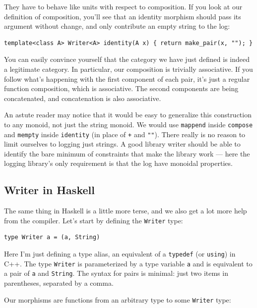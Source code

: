 They have to behave like units with respect to composition. If you look
at our definition of composition, you'll see that an identity morphism
should pass its argument without change, and only contribute an empty
string to the log:

\begin{verbatim}
template<class A> Writer<A> identity(A x) { return make_pair(x, ""); }
\end{verbatim}

You can easily convince yourself that the category we have just defined
is indeed a legitimate category. In particular, our composition is
trivially associative. If you follow what's happening with the first
component of each pair, it's just a regular function composition, which
is associative. The second components are being concatenated, and
concatenation is also associative.

An astute reader may notice that it would be easy to generalize this
construction to any monoid, not just the string monoid. We would use
\texttt{mappend} inside \texttt{compose} and \texttt{mempty} inside
\texttt{identity} (in place of \texttt{+} and \texttt{""}). There really
is no reason to limit ourselves to logging just strings. A good library
writer should be able to identify the bare minimum of constraints that
make the library work --- here the logging library's only requirement is
that the log have monoidal properties.

\subsection{Writer in Haskell}\label{writer-in-haskell}

The same thing in Haskell is a little more terse, and we also get a lot
more help from the compiler. Let's start by defining the \texttt{Writer}
type:

\begin{verbatim}
type Writer a = (a, String)
\end{verbatim}

Here I'm just defining a type alias, an equivalent of a \texttt{typedef}
(or \texttt{using}) in C++. The type \texttt{Writer} is parameterized by
a type variable \texttt{a} and is equivalent to a pair of \texttt{a} and
\texttt{String}. The syntax for pairs is minimal: just two items in
parentheses, separated by a comma.

Our morphisms are functions from an arbitrary type to some
\texttt{Writer} type:

